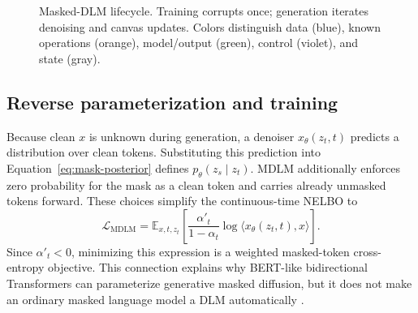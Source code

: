 \documentclass{article}
\begin{document}
\begin{figure}[t]
{
}
\caption{Masked-DLM lifecycle.  Training corrupts once; generation iterates
denoising and canvas updates.  Colors distinguish data (blue), known
operations (orange), model/output (green), control (violet), and state (gray).}
\label{fig:dlm-process}
\end{figure}

\subsection{Reverse parameterization and training}

Because clean \(x\) is unknown during generation, a denoiser
\(x_\theta(z_t,t)\) predicts a distribution over clean tokens.  Substituting
this prediction into Equation~\ref{eq:mask-posterior} defines
\(p_\theta(z_s\mid z_t)\).  MDLM additionally enforces zero probability for
the mask as a clean token and carries already unmasked tokens forward.  These
choices simplify the continuous-time NELBO to
\begin{equation}
\mathcal{L}_{\mathrm{MDLM}}
=\mathbb{E}_{x,t,z_t}
\left[\frac{\alpha'_t}{1-\alpha_t}
\log \langle x_\theta(z_t,t),x\rangle\right].
\label{eq:mdlm-loss}
\end{equation}
Since \(\alpha'_t<0\), minimizing this expression is a weighted masked-token
cross-entropy objective.  This connection explains why BERT-like bidirectional
Transformers can parameterize generative masked diffusion, but it does not
make an ordinary masked language model a DLM automatically
\citep{he2023diffusionbert,zheng2024rdm,sahoo2024mdlm}.
\end{document}
